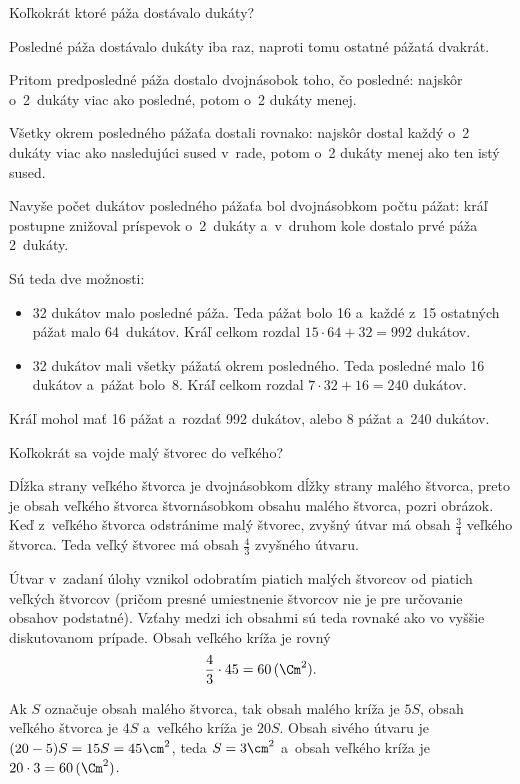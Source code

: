 {%
\napad
Koľkokrát ktoré páža dostávalo dukáty?

\riesenie
Posledné páža dostávalo dukáty iba raz, naproti tomu ostatné pážatá dvakrát.

Pritom predposledné páža dostalo dvojnásobok toho, čo posledné: najskôr o~2~dukáty viac ako posledné, potom o~2 dukáty menej.

Všetky okrem posledného pážaťa dostali rovnako: najskôr dostal každý o~2 dukáty viac ako nasledujúci sused v~rade, potom o~2 dukáty menej ako ten istý sused.

Navyše počet dukátov posledného pážaťa bol dvojnásobkom počtu pážat: kráľ postupne znižoval príspevok o~2~dukáty a~v~druhom kole dostalo prvé páža 2~dukáty.

Sú teda dve možnosti:
\begin{itemize}
\item
32 dukátov malo posledné páža.
Teda pážat bolo 16 a~každé z~15 ostatných pážat malo 64~dukátov.
Kráľ celkom rozdal $15\cdot64+32=992$ dukátov.
\item
32 dukátov mali všetky pážatá okrem posledného.
Teda posledné malo 16 dukátov a~pážat bolo~8.
Kráľ celkom rozdal $7\cdot32+16=240$ dukátov.
\end{itemize}

Kráľ mohol mať 16 pážat a~rozdať 992 dukátov, alebo 8 pážat a~240 dukátov.
}

{%
\napad
Koľkokrát sa vojde malý štvorec do veľkého?

\riesenie
Dĺžka strany veľkého štvorca je dvojnásobkom dĺžky strany malého štvorca, preto je obsah veľkého štvorca štvornásobkom obsahu malého štvorca, pozri obrázok.
Keď z~veľkého štvorca odstránime malý štvorec, zvyšný útvar má obsah $\frac34$ veľkého štvorca.
Teda veľký štvorec má obsah $\frac43$ zvyšného útvaru.
%


Útvar v~zadaní úlohy vznikol odobratím piatich malých štvorcov od piatich veľkých štvorcov (pričom presné umiestnenie štvorcov nie je pre určovanie obsahov podstatné).
Vzťahy medzi ich obsahmi sú teda rovnaké ako vo vyššie diskutovanom prípade.
Obsah veľkého kríža je rovný
$$
\frac43\cdot 45=60\,(\Cm^2).
$$

\poznamka
Ak $S$ označuje obsah malého štvorca, tak obsah malého kríža je $5S$, obsah veľkého štvorca je $4S$ a~veľkého kríža je $20S$.
Obsah sivého útvaru je $(20-5)S=15S=45\cm^2$, teda $S=3\cm^2$ a~obsah veľkého kríža je $20\cdot3=60\,(\Cm^2)$.
}

